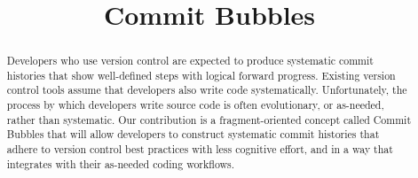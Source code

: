 \documentclass[conference]{IEEEtran}
\begin{document}
%

\title{Commit Bubbles}



\author{
}


\maketitle

\begin{abstract}
Developers who use version control are expected to produce systematic commit histories that show well-defined steps with logical forward progress.
Existing version control tools assume that developers also write code systematically.
Unfortunately, the process by which developers write source code is often evolutionary, or as-needed, rather than systematic.  
Our contribution is a fragment-oriented concept called Commit Bubbles that will allow developers to construct systematic commit histories that adhere to version control best practices with less cognitive effort, and in a way that integrates with their as-needed coding workflows.
\end{abstract}



%
\IEEEpeerreviewmaketitle
\end{document}
